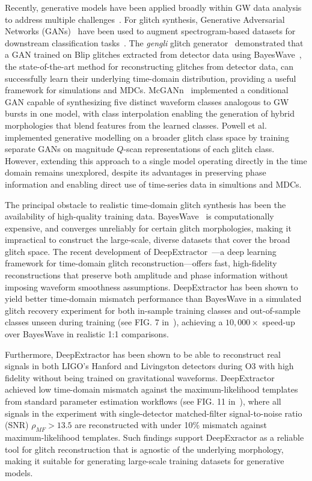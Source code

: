 \documentclass[reprint,nofootinbib,amsmath,amssymb,aps,floatfix]{revtex4-2}
\begin{document}
Recently, generative models have been applied broadly within GW data analysis to address multiple challenges~\cite{Liao:2021vec, PhysRevD.110.104055}.
For glitch synthesis, Generative Adversarial Networks (GANs)~\cite{Goodfellow:2014upx} have been used to augment spectrogram-based datasets for downstream classification tasks~\cite{GAN_spec_best, Jade_Powell_paper}.
The \textit{gengli} glitch generator~\cite{GENGLI, GENGLI_2} demonstrated that a GAN trained on Blip glitches extracted from detector data using BayesWave~\cite{BayesWave}, the state-of-the-art method for reconstructing glitches from detector data, can successfully learn their underlying time-domain distribution, providing a useful framework for simulations and MDCs.
McGANn~\cite{McGinn_2021} implemented a conditional GAN capable of synthesizing five distinct waveform classes analogous to GW bursts in one model, with class interpolation enabling the generation of hybrid morphologies that blend features from the learned classes.
Powell et al.~\cite{Jade_Powell_paper} implemented generative modelling on a broader glitch class space by training separate GANs on magnitude $Q$-scan representations of each glitch class.
However, extending this approach to a single model operating directly in the time domain remains unexplored, despite its advantages in preserving phase information and enabling direct use of time-series data in simultions and MDCs.

The principal obstacle to realistic time-domain glitch synthesis has been the availability of high-quality training data.
BayesWave~\cite{BayesWave} is computationally expensive, and converges unreliably for certain glitch morphologies, making it impractical to construct the large-scale, diverse datasets that cover the broad glitch space.
The recent development of DeepExtractor~\cite{DeepExtractor_paper}---a deep learning framework for time-domain glitch reconstruction---offers fast, high-fidelity reconstructions that preserve both amplitude and phase information without imposing waveform smoothness assumptions.
DeepExtractor has been shown to yield better time-domain mismatch performance than BayesWave in a simulated glitch recovery experiment for both in-sample training classes and out-of-sample classes unseen during training (see FIG. 7 in~\cite{DeepExtractor_paper}), achieving a $10{,}000\times$ speed-up over BayesWave in realistic 1:1 comparisons.

Furthermore, DeepExtractor has been shown to be able to reconstruct real signals in both LIGO's Hanford and Livingston detectors during O3 with high fidelity without being trained on gravitational waveforms. 
DeepExtractor achieved low time-domain mismatch against the maximum-likelihood templates from standard parameter estimation workflows (see FIG. 11 in~\cite{DeepExtractor_paper}), where all signals in the experiment with single-detector matched-filter signal-to-noise ratio (SNR) $\rho_{MF}>13.5$ are reconstructed with under 10\% mismatch against maximum-likelihood templates.
Such findings support DeepExractor as a reliable tool for glitch reconstruction that is agnostic of the underlying morphology, making it suitable for generating large-scale training datasets for generative models.
\end{document}
